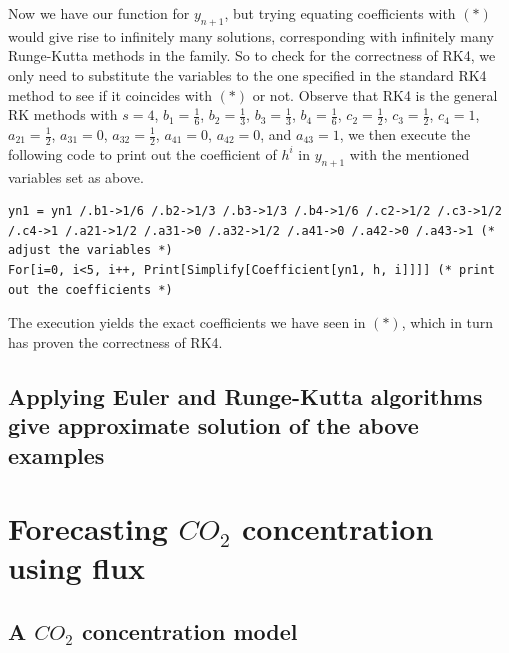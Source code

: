 \documentclass[a4paper]{article}
\begin{document}
Now we have our function for \(y_{n+1}\), but trying equating coefficients with \((*)\) would give rise to infinitely many solutions, corresponding with infinitely many Runge-Kutta methods in the family. So to check for the correctness of RK4, we only need to substitute the variables to the one specified in the standard RK4 method to see if it coincides with \((*)\) or not. Observe that RK4 is the general RK methods with \(s = 4\), \(b_1 = \frac{1}{6}\), \(b_2 = \frac{1}{3}\), \(b_3 = \frac{1}{3}\), \(b_4 = \frac{1}{6}\), \(c_2 = \frac{1}{2}\), \(c_3 = \frac{1}{2}\), \(c_4 = 1\), \(a_{21} = \frac{1}{2}\), \(a_{31} = 0\), \(a_{32} = \frac{1}{2}\), \(a_{41} = 0\), \(a_{42} = 0\), and \(a_{43} = 1\), we then execute the following code to print out the coefficient of \(h^i\) in \(y_{n+1}\) with the mentioned variables set as above.
\begin{mdframed}[leftline=false,rightline=false,backgroundcolor=magenta!10]
  \begin{verbatim}
yn1 = yn1 /.b1->1/6 /.b2->1/3 /.b3->1/3 /.b4->1/6 /.c2->1/2 /.c3->1/2 /.c4->1 /.a21->1/2 /.a31->0 /.a32->1/2 /.a41->0 /.a42->0 /.a43->1 (* adjust the variables *)
For[i=0, i<5, i++, Print[Simplify[Coefficient[yn1, h, i]]]] (* print out the coefficients *)
  \end{verbatim}
\end{mdframed}

The execution yields the exact coefficients we have seen in \((*)\), which in turn has proven the correctness of RK4.

\subsection{Applying Euler and Runge-Kutta algorithms give approximate solution of the above examples}


\newpage
\section{Forecasting \(CO_2\) concentration using flux}
\subsection{A \(CO_2\) concentration model}
\end{document}
